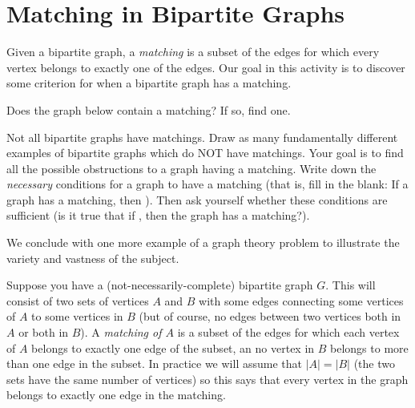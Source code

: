 \documentclass[12pt]{article}
\begin{document}
\section{Matching in Bipartite Graphs}

\begin{activity}
\noindent Given a bipartite graph, a {\em matching} is a subset of the edges for which every vertex belongs to exactly one of the edges.  Our goal in this activity is to discover some criterion for when a bipartite graph has a matching.

\begin{questions}
\question Does the graph below contain a matching?  If so, find one.

\begin{center}
\end{center}


\question Not all bipartite graphs have matchings.  Draw as many fundamentally different examples of bipartite graphs which do NOT have matchings.  Your goal is to find all the possible obstructions to a graph having a matching.  Write down the {\em necessary} conditions for a graph to have a matching (that is, fill in the blank: If a graph has a matching, then \underline{\hspace{1in}}).  Then ask yourself whether these conditions are sufficient (is it true that if \underline{\hspace{1in}}, then the graph has a matching?).




\end{questions}

\end{activity}


We conclude with one more example of a graph theory problem to illustrate the variety and vastness of the subject.

Suppose you have a (not-necessarily-complete) bipartite graph $G$.  This will consist of two sets of vertices $A$ and $B$ with some edges connecting some vertices of $A$ to some vertices in $B$ (but of course, no edges between two vertices both in $A$ or both in $B$).  A {\em matching of $A$} is a subset of the edges for which each vertex of $A$ belongs to exactly one edge of the subset, an no vertex in $B$ belongs to more than one edge in the subset.  In practice we will assume that $|A| = |B|$ (the two sets have the same number of vertices) so this says that every vertex in the graph belongs to exactly one edge in the matching.  
\end{document}
